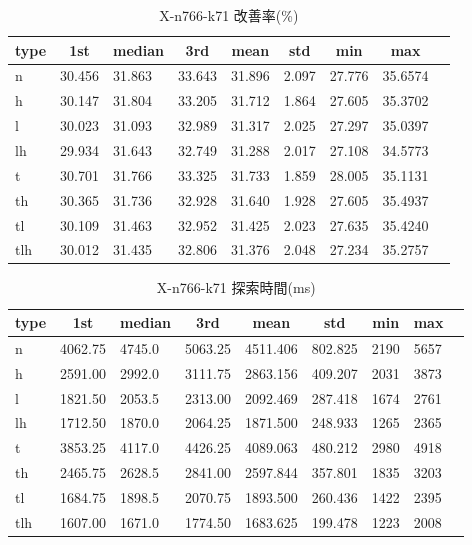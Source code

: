 \begin{table}[htbp]
    \caption{X-n766-k71 改善率(\%)}
    \begin{tabular}{|l|l|l|l|l|l|l|l|l|}\hline
    \multicolumn{1}{|c|}{\textbf{type}}
    &\multicolumn{1}{|c|}{\textbf{1st}}
    &\multicolumn{1}{c|}{\textbf{median}}
    &\multicolumn{1}{c|}{\textbf{3rd}}
    &\multicolumn{1}{c|}{\textbf{mean}}
    &\multicolumn{1}{c|}{\textbf{std}}
    &\multicolumn{1}{c|}{\textbf{min}}
    &\multicolumn{1}{c|}{\textbf{max}}\\\hline
	n & 30.456 & 31.863 & 33.643 & 31.896 & 2.097 & 27.776 & 35.6574\\\hline
	h & 30.147 & 31.804 & 33.205 & 31.712 & 1.864 & 27.605 & 35.3702\\\hline
	l & 30.023 & 31.093 & 32.989 & 31.317 & 2.025 & 27.297 & 35.0397\\\hline
	lh & 29.934 & 31.643 & 32.749 & 31.288 & 2.017 & 27.108 & 34.5773\\\hline
	t & 30.701 & 31.766 & 33.325 & 31.733 & 1.859 & 28.005 & 35.1131\\\hline
	th & 30.365 & 31.736 & 32.928 & 31.640 & 1.928 & 27.605 & 35.4937\\\hline
	tl & 30.109 & 31.463 & 32.952 & 31.425 & 2.023 & 27.635 & 35.4240\\\hline
	tlh & 30.012 & 31.435 & 32.806 & 31.376 & 2.048 & 27.234 & 35.2757\\\hline
	\end{tabular}
\end{table}
\begin{table}[htbp]
    \caption{X-n766-k71 探索時間(ms)}
    \begin{tabular}{|l|l|l|l|l|l|l|l|l|}\hline
    \multicolumn{1}{|c|}{\textbf{type}}
    &\multicolumn{1}{|c|}{\textbf{1st}}
    &\multicolumn{1}{c|}{\textbf{median}}
    &\multicolumn{1}{c|}{\textbf{3rd}}
    &\multicolumn{1}{c|}{\textbf{mean}}
    &\multicolumn{1}{c|}{\textbf{std}}
    &\multicolumn{1}{c|}{\textbf{min}}
    &\multicolumn{1}{c|}{\textbf{max}}\\\hline
	n & 4062.75 & 4745.0 & 5063.25 & 4511.406 & 802.825 & 2190 & 5657\\\hline
	h & 2591.00 & 2992.0 & 3111.75 & 2863.156 & 409.207 & 2031 & 3873\\\hline
	l & 1821.50 & 2053.5 & 2313.00 & 2092.469 & 287.418 & 1674 & 2761\\\hline
	lh & 1712.50 & 1870.0 & 2064.25 & 1871.500 & 248.933 & 1265 & 2365\\\hline
	t & 3853.25 & 4117.0 & 4426.25 & 4089.063 & 480.212 & 2980 & 4918\\\hline
	th & 2465.75 & 2628.5 & 2841.00 & 2597.844 & 357.801 & 1835 & 3203\\\hline
	tl & 1684.75 & 1898.5 & 2070.75 & 1893.500 & 260.436 & 1422 & 2395\\\hline
	tlh & 1607.00 & 1671.0 & 1774.50 & 1683.625 & 199.478 & 1223 & 2008\\\hline
	\end{tabular}
\end{table}

